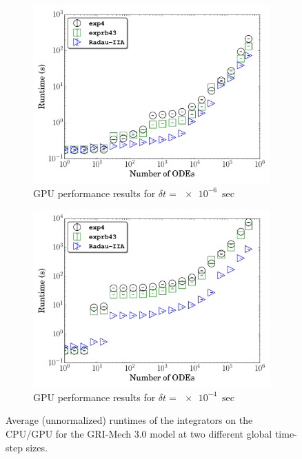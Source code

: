 \documentclass[final,twocolumn]{elsarticle}
\begin{document}
\begin{figure}[htb]
\begin{subfigure}{0.49\textwidth}
      \includegraphics[width=\linewidth]{CH4_1e-06_gpu_nonorm.pdf}
      \caption{GPU performance results for $\delta t = \SI{e-6}{\sec}$}
  \end{subfigure}
  \begin{subfigure}{0.49\textwidth}
      \includegraphics[width=\linewidth]{CH4_1e-04_gpu_nonorm.pdf}
      \caption{GPU performance results for $\delta t = \SI{e-4}{\sec}$}
  \end{subfigure}
  \caption{Average (unnormalized) runtimes of the integrators on the CPU\slash GPU for the GRI-Mech 3.0 model at two different global time-step sizes.}
\end{figure}

\clearpage

\ifmeasure
\footnotesize
\baselineskip 9pt
\setlength{\bibsep}{0pt plus 0.3ex}
\fi
{}


\fi
\end{document}
